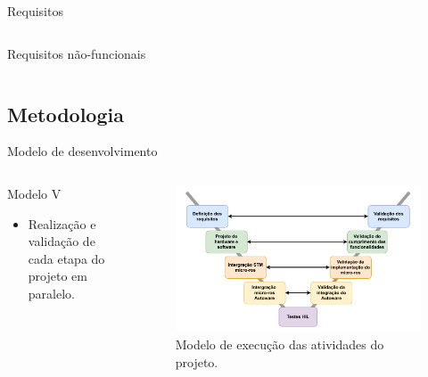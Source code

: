 \documentclass{if-beamer}
\begin{document}
\begin{frame}{Requisitos}
\begin{columns}
\begin{column}{0.5\textwidth}
\begin{block}{Requisitos não-funcionais}
			\end{block}
			
		\end{column}
		
	\end{columns}
	
\pause
	
\end{frame}

\subsection*{Metodologia}

\begin{frame}{Modelo de desenvolvimento}
	
	\begin{columns}
		
		\begin{column}{0.4\textwidth}
			
			\begin{block}{Modelo V}
				
				\begin{itemize}
					\item Realização e validação de cada etapa do projeto em paralelo.
					
				\end{itemize}
				
			\end{block}
			
		\end{column}
		
		\begin{column}{0.7\textwidth}
			
			
			\begin{figure}
				\centering
				\includegraphics[width=\linewidth]{img/modelo-v}
				\caption{Modelo de execução das atividades do projeto.}
				\label{fig:modelo-v}
			\end{figure}
			
		\end{column}
		
	\end{columns}
	
\end{frame}
\end{document}
